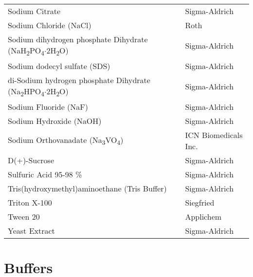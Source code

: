 \begin{center}
\begin{longtable}{P{4.415in} P{1.52in}}
Sodium Citrate & Sigma-Aldrich\\
Sodium Chloride (NaCl) & Roth \\
Sodium dihydrogen phosphate Dihydrate (NaH\textsubscript{2}PO\textsubscript{4}$\cdot$2H\textsubscript{2}O) & Sigma-Aldrich\\
Sodium dodecyl sulfate (SDS) & Sigma-Aldrich\\
di-Sodium hydrogen phosphate Dihydrate (Na\textsubscript{2}HPO\textsubscript{4}$\cdot$2H\textsubscript{2}O) & Sigma-Aldrich\\
Sodium Fluoride (NaF) & Sigma-Aldrich\\
Sodium Hydroxide (NaOH) & Sigma-Aldrich \\
Sodium Orthovanadate (Na\textsubscript{3}VO\textsubscript{4}) & ICN Biomedicals Inc.\\ 
D(+)-Sucrose & Sigma-Aldrich \\
Sulfuric Acid 95-98 \% & Sigma-Aldrich\\
Tris(hydroxymethyl)aminoethane (Tris Buffer) & Sigma-Aldrich \\
Triton X-100 & Siegfried \\
Tween 20 & Applichem \\
Yeast Extract & Sigma-Aldrich \\[.8ex]
\hline
\end{longtable}
\end{center}



\section{Buffers}

